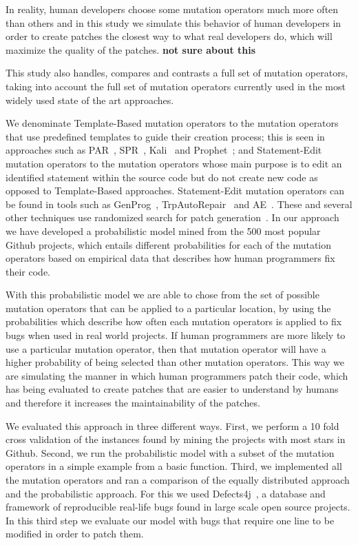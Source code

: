 \documentclass[conference]{IEEEtran}
\newcommand{\todo}[1]
  {{\scriptsize \textbf{\color{red} {#1}}}}
\begin{document}
In reality, human developers choose some mutation operators 
much more often than 
others and in this study we simulate this behavior of human developers in order 
to create patches the closest way to what real developers do, which will 
maximize the quality of the patches. \todo{not sure about this}

 This study also 
handles, compares and contrasts a full set of mutation operators, taking into
account the full set of mutation operators currently used in the most widely used state of the art approaches.


We denominate Template-Based mutation operators to the mutation operators that 
use predefined templates to guide their creation process; this is seen in 
approaches such 
as PAR~\cite{kim2013}, SPR~\cite{fan15}, Kali~\cite{Qi15} and 
Prophet~\cite{Long2016}; and 
Statement-Edit mutation operators to the mutation operators whose main 
purpose is to edit an identified statement within the source code but do not 
create new code as opposed to 
Template-Based approaches. Statement-Edit mutation operators can be found in 
tools such as GenProg~\cite{legoues2012}, TrpAutoRepair~\cite{Qi13} and 
AE~\cite{Weimer13}.
These and several other techniques use randomized search
for patch generation~\cite{arcuri08,bradbury10,Qi14,Weimer13}. In our approach 
we have developed a probabilistic model mined 
from the 500 most popular Github projects, which 
entails different probabilities for each of the mutation operators based on 
empirical data that describes how human programmers fix their code.

With this probabilistic model we are able to chose from the set of possible
mutation operators that can be applied to a particular location, by using the
probabilities which describe how often each mutation operators is applied
to fix bugs when used in real world projects. If human programmers are more likely to
use a particular mutation operator, then that mutation operator will have a
higher probability of being selected than other mutation operators. This way we 
are simulating the manner in which human programmers patch their code, which has 
being evaluated to create patches that are easier to understand by humans~\cite{kim2013} and 
therefore it increases the maintainability of the patches. 

We evaluated this approach in three different ways. First, we perform a 10 fold 
cross validation of the instances found by mining the projects with most stars 
in Github. Second, we run the probabilistic model with a subset of the mutation 
operators in a simple example from a basic function. Third, we implemented all 
the mutation operators and ran a comparison of the equally distributed approach 
and the probabilistic approach. For this we used Defects4j~\cite{just14}, a 
database and framework of reproducible real-life bugs found in large scale open 
source projects. In this third step we evaluate our model with bugs that require 
one line to be modified in order to patch them.
\end{document}
